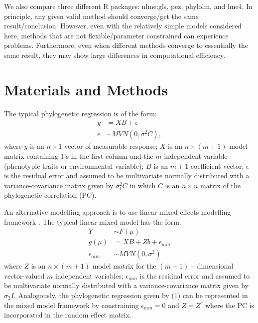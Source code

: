 We also compare three different R packages: nlme:gls, pez, phylolm, and lme4.
In principle, any given valid method should converge/get the same result/conclusion.
However, even with the relatively simple models considered here, methods that are not flexible/parameter constrained can experience problems.
Furthermore, even when different methods converge to essentially the same result, they may show large differences in computational efficiency.

\section{Materials and Methods}

The typical phylogenetic regression is of the form:
\begin{align}
y & = XB + \epsilon \\
\epsilon & \sim MVN(0,\sigma^{2}C),
\label{eq:gls}
\end{align}
where $y$ is an $n \times 1$ vector of measurable response; $X$ is an $n \times (m + 1)$ model matrix containing 1's in the first column and the $m$ independent variable (phenotypic traits or environmental variable); $B$ is an $m + 1$ coefficient vector; $\epsilon$ is the residual error and assumed to be multivariate normally distributed with a variance-covariance matrix given by $\sigma^{2}_{\epsilon}C$ in which $C$ is an $n \times n$ matrix of the phylogenetic correlation (PC).

An alternative modelling approach is to use linear mixed effects modelling framework \citep{lynch1991methods}.
The typical linear mixed model has the form:
\begin{align}
Y & \sim F(\mu) \\
g(\mu) & = XB + Zb + \epsilon_{mm} \\
\epsilon_{mm} & \sim MVN(0,\sigma^2)
\end{align}
where $Z$ is an $n \times (m+1)$ model matrix for the $(m+1)$ -- dimensional vector-valued $m$ independent variables; $\epsilon_{mm}$ is the residual error and assumed to be multivariate normally distributed with a variance-covariance matrix given by $\sigma_{2}I$.
Analogously, the phylogenetic regression given by (1) can be represented in the mixed model framework by constraining $\epsilon_{mm} = 0$ and $Z=Z^{c}$ where the PC is incorporated in the random effect matrix. 

